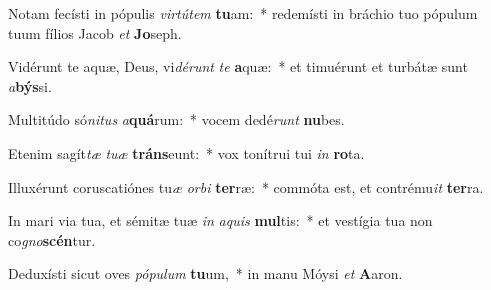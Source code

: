 \item Notam fecísti in pópulis \textit{vir}\textit{tú}\textit{tem} \textbf{tu}am:~* redemísti in bráchio tuo pópulum tuum fílios Jacob \textit{et} \textbf{Jo}seph.
\item Vidérunt te aquæ, Deus, vi\textit{dé}\textit{runt} \textit{te} \textbf{a}quæ:~* et timuérunt et turbátæ sunt \textit{a}\textbf{býs}si.
\item Multitúdo só\textit{ni}\textit{tus} \textit{a}\textbf{quá}rum:~* vocem dedé\textit{runt} \textbf{nu}bes.
\item Etenim sagít\textit{tæ} \textit{tu}\textit{æ} \textbf{tráns}eunt:~* vox tonítrui tui \textit{in} \textbf{ro}ta.
\item Illuxérunt coruscatiónes tu\textit{æ} \textit{or}\textit{bi} \textbf{ter}ræ:~* commóta est, et contrému\textit{it} \textbf{ter}ra.
\item In mari via tua, et sémitæ tuæ \textit{in} \textit{a}\textit{quis} \textbf{mul}tis:~* et vestígia tua non co\textit{gno}\textbf{scén}tur.
\item Deduxísti sicut oves \textit{pó}\textit{pu}\textit{lum} \textbf{tu}um,~* in manu Móysi \textit{et} \textbf{A}aron.
